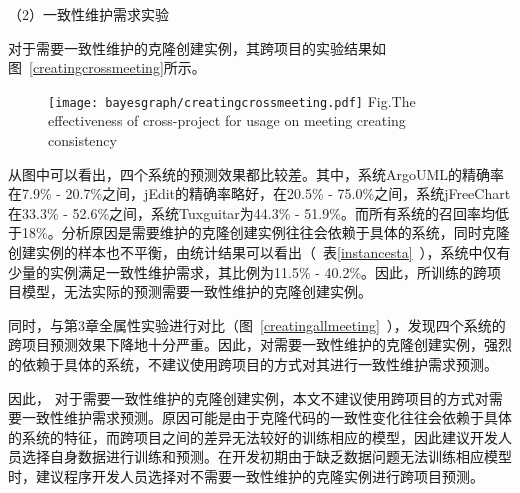 （2）一致性维护需求实验

对于需要一致性维护的克隆创建实例，其跨项目的实验结果如图~\ref{creatingcrossmeeting}所示。

\begin{figure}[h]
\centering
\texttt{[image: bayesgraph/creatingcrossmeeting.pdf]}
{Fig.$\!$}{The effectiveness of cross-project for usage on meeting creating consistency}
\vspace{-1em}
\end{figure}

从图中可以看出，四个系统的预测效果都比较差。其中，系统ArgoUML的精确率在7.9\% - 20.7\%之间，jEdit的精确率略好，在20.5\% - 75.0\%之间，系统jFreeChart在33.3\% - 52.6\%之间，系统Tuxguitar为44.3\% - 51.9\%。而所有系统的召回率均低于18\%。分析原因是需要维护的克隆创建实例往往会依赖于具体的系统，同时克隆创建实例的样本也不平衡，由统计结果可以看出（~表\ref{instancesta}~），系统中仅有少量的实例满足一致性维护需求，其比例为11.5\% - 40.2\%。因此，所训练的跨项目模型，无法实际的预测需要一致性维护的克隆创建实例。

同时，与第3章全属性实验进行对比（图~\ref{creatingallmeeting}~），发现四个系统的跨项目预测效果下降地十分严重。因此，对需要一致性维护的克隆创建实例，强烈的依赖于具体的系统，不建议使用跨项目的方式对其进行一致性维护需求预测。

因此， 对于需要一致性维护的克隆创建实例，本文不建议使用跨项目的方式对需要一致性维护需求预测。原因可能是由于克隆代码的一致性变化往往会依赖于具体的系统的特征，而跨项目之间的差异无法较好的训练相应的模型，因此建议开发人员选择自身数据进行训练和预测。在开发初期由于缺乏数据问题无法训练相应模型时，建议程序开发人员选择对不需要一致性维护的克隆实例进行跨项目预测。

